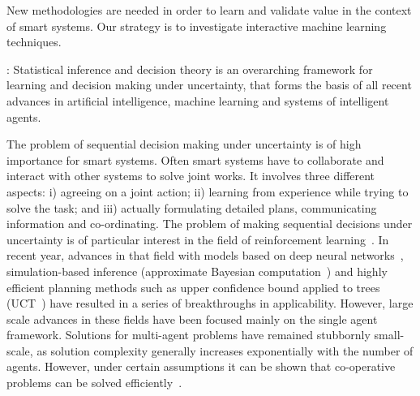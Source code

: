 \documentclass[12pt]{article}
\begin{document}
New methodologies are needed in order to learn and validate value in the context of smart systems. Our strategy is
to investigate interactive machine learning techniques. 


: 
Statistical inference and decision theory is an overarching framework
for learning and decision making under uncertainty, that forms the
basis of all recent advances in artificial intelligence, machine
learning and systems of intelligent agents. 


The problem of sequential decision making under uncertainty is of high importance for smart systems. 
Often smart systems have to collaborate and interact with other systems to solve joint works. It involves three
different aspects: i) agreeing on a joint action; ii) learning from experience
while trying to solve the task; and iii) actually formulating detailed plans, communicating information and
co-ordinating. The problem of making sequential decisions under uncertainty is of
particular interest in the field of reinforcement
learning~\cite{suba,BertsekasTsitsiklis:NDP}. In recent year, advances
in that field with models based on deep neural
networks~\cite{mnih2015human}, simulation-based inference (approximate
Bayesian computation~\cite{icml:abcrl}) and highly efficient planning
methods such as upper confidence bound applied to trees
(UCT~\cite{ECML:Kocsis+Szepesvari:2006}) have resulted in a series of
breakthroughs in applicability. %
However, large scale advances in these fields have been focused mainly
on the single agent framework. Solutions for multi-agent problems have
remained stubbornly small-scale, as solution complexity generally
increases exponentially with the number of agents. However, under
certain assumptions it can be shown that co-operative problems can be
solved efficiently~\cite{brammert:duct:jair:2014}.
\end{document}
